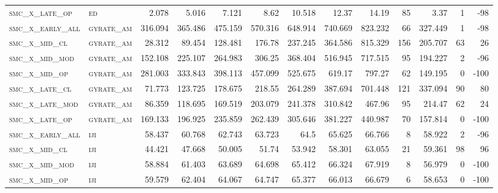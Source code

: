 \begin{landscape}
\begin{center}
\begin{footnotesize}
\begin{longtable}{llrrrrrrrr|rrr}
\textsc{smc\_x\_late\_op  } & \textsc{ed        }   & 2.078    & 5.016    & 7.121    & 8.62     & 10.518   & 12.37    & 14.19    & 85     & 3.37          & 1             & -98             \\
\textsc{smc\_x\_early\_all} & \textsc{gyrate\_am}   & 316.094  & 365.486  & 475.159  & 570.316  & 648.914  & 740.669  & 823.232  & 66     & 327.449       & 1             & -98             \\
\textsc{smc\_x\_mid\_cl   } & \textsc{gyrate\_am}   & 28.312   & 89.454   & 128.481  & 176.78   & 237.245  & 364.586  & 815.329  & 156    & 205.707       & 63            & 26              \\
\textsc{smc\_x\_mid\_mod  } & \textsc{gyrate\_am}   & 152.108  & 225.107  & 264.983  & 306.25   & 368.404  & 516.945  & 717.515  & 95     & 194.227       & 2             & -96             \\
\textsc{smc\_x\_mid\_op   } & \textsc{gyrate\_am}   & 281.003  & 333.843  & 398.113  & 457.099  & 525.675  & 619.17   & 797.27   & 62     & 149.195       & 0             & -100            \\
\textsc{smc\_x\_late\_cl  } & \textsc{gyrate\_am}   & 71.773   & 123.725  & 178.675  & 218.55   & 264.289  & 387.694  & 701.448  & 121    & 337.094       & 90            & 80              \\
\textsc{smc\_x\_late\_mod } & \textsc{gyrate\_am}   & 86.359   & 118.695  & 169.519  & 203.079  & 241.378  & 310.842  & 467.96   & 95     & 214.47        & 62            & 24              \\
\textsc{smc\_x\_late\_op  } & \textsc{gyrate\_am}   & 169.133  & 196.925  & 235.859  & 262.439  & 305.646  & 381.227  & 440.987  & 70     & 157.814       & 0             & -100            \\
\textsc{smc\_x\_early\_all} & \textsc{iji       }   & 58.437   & 60.768   & 62.743   & 63.723   & 64.5     & 65.625   & 66.766   & 8      & 58.922        & 2             & -96             \\
\textsc{smc\_x\_mid\_cl   } & \textsc{iji       }   & 44.421   & 47.668   & 50.005   & 51.74    & 53.942   & 58.301   & 63.055   & 21     & 59.361        & 98            & 96              \\
\textsc{smc\_x\_mid\_mod  } & \textsc{iji       }   & 58.884   & 61.403   & 63.689   & 64.698   & 65.412   & 66.324   & 67.919   & 8      & 56.979        & 0             & -100            \\
\textsc{smc\_x\_mid\_op   } & \textsc{iji       }   & 59.579   & 62.404   & 64.067   & 64.747   & 65.377   & 66.013   & 66.679   & 6      & 58.653        & 0             & -100            \\

\end{longtable}
\end{footnotesize}
\end{center}
\end{landscape}
